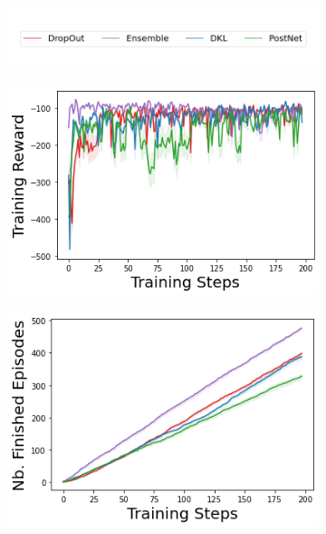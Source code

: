 \begin{figure}
    \centering
        \begin{subfigure}{.5\textwidth}
        \includegraphics[width=\textwidth]{sections/011_icml2022/resources/legend.png}
    \end{subfigure}
    \vspace{-5mm}
    
    \begin{subfigure}{.245\textwidth}
        \includegraphics[width=\textwidth]{sections/011_icml2022/resources/acrobot-training_total_reward-training-model.png}
    \end{subfigure}
    \begin{subfigure}{.245\textwidth}
        \includegraphics[width=\textwidth]{sections/011_icml2022/resources/acrobot-n_finished_training_episodes-training-model.png}  

\end{subfigure}
\end{figure}
